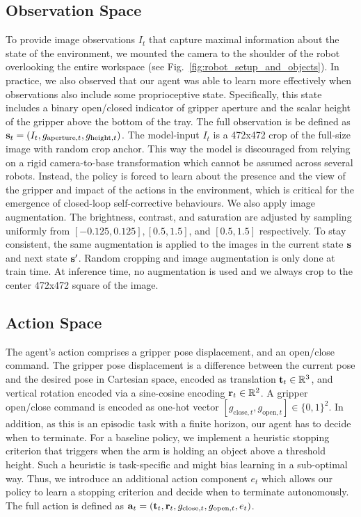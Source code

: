 \documentclass{article}
\begin{document}
\subsection{Observation Space}
To provide image observations $I_t$ that capture maximal information about the state of the environment, we mounted the camera to the shoulder of the robot overlooking the entire workspace (see Fig.~\ref{fig:robot_setup_and_objects}).
In practice, we also observed that our agent was able to learn more effectively when observations also include some proprioceptive state. Specifically, this state includes a binary open/closed indicator of gripper aperture and the scalar height of the gripper above the bottom of the tray. The full observation is be defined as $\mathbf{s}_t = (I_t, g_{\text{aperture},t}, g_{\text{height},t})$. The model-input $I_t$ is a 472x472 crop of the full-size image with random crop anchor. This way the model is discouraged from relying on a rigid camera-to-base transformation which cannot be assumed across several robots. Instead, the policy is forced to learn about the presence and the view of the gripper and impact of the actions in the environment, which is critical for the emergence of closed-loop self-corrective behaviours. We also apply image augmentation. The brightness, contrast, and saturation are adjusted by sampling uniformly from $[-0.125, 0.125], [0.5, 1.5]$, and $[0.5, 1.5]$ respectively. To stay consistent, the same augmentation is applied to the images in the current state $\mathbf{s}$ and next state $\mathbf{s}'$. Random cropping and image augmentation is only done at train time. At inference time, no augmentation is used and we always crop to the center 472x472 square of the image.

\subsection{Action Space}

The agent's action comprises a gripper pose displacement, and an open/close command. The gripper pose displacement is a difference between the current pose and the desired pose in Cartesian space, encoded as translation $\mathbf{t}_t \in \mathbb{R}^3$, and vertical rotation encoded via a sine-cosine encoding $\mathbf{r}_t \in \mathbb{R}^2$. A gripper open/close command is encoded as one-hot vector $[g_{\text{close},t}, g_{\text{open},t}] \in \{0, 1\}^2$. In addition, as this is an episodic task with a finite horizon, our agent has to decide when to terminate. For a baseline policy, we implement a heuristic stopping criterion that triggers when the arm is holding an object above a threshold height. Such a heuristic is task-specific and might bias learning in a sub-optimal way. Thus, we introduce an additional action component $e_t$ which allows our policy to learn a stopping criterion and decide when to terminate autonomously. The full action is defined as $\mathbf{a}_t = (\mathbf{t}_t, \mathbf{r}_t, g_{\text{close},t}, g_{\text{open},t}, e_t)$.\\
\end{document}
